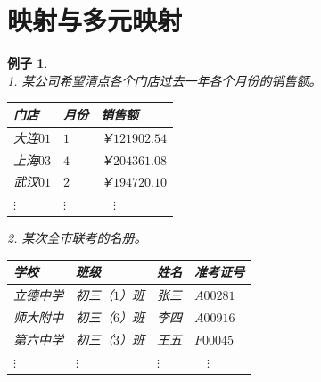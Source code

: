 \documentclass[12pt,UTF8]{ctexbook}
\newtheorem{ex}{例子}[section]
\begin{document}
\section{映射与多元映射}
\begin{ex}
    \mbox{}\\
    1. 某公司希望清点各个门店过去一年各个月份的销售额。
    \begin{center}
        \begin{tabular}{| p{4em}<{\centering} | p{2em}<{\centering} | p{6em}<{\centering} |}
            \hline
            门店 & 月份 & 销售额 \\ [0.5ex] 
            \hline
            大连$01$ & $1$ & ￥$121902.54$ \\  
            \hline
            上海$03$ & $4$ & ￥$204361.08$ \\  
            \hline
            武汉$01$ & $2$ & ￥$194720.10$ \\  
            \hline
            $\vdots$ & $\vdots$ & $\quad\vdots$ \\   
            \hline
        \end{tabular}
    \end{center}
    2. 某次全市联考的名册。
    \begin{center}
        \begin{tabular}{| p{4em}<{\centering} | p{6em}<{\centering} | p{3em}<{\centering} | p{4em}<{\centering} |}
            \hline
            学校 & 班级 & 姓名 & 准考证号 \\ [0.5ex] 
            \hline
            立德中学 & 初三（$1$）班 & 张三 & $A00281$ \\  
            \hline
            师大附中 & 初三（$6$）班 & 李四 & $A00916$ \\  
            \hline
            第六中学 & 初三（$3$）班 & 王五 & $F00045$ \\  
            \hline
            $\vdots$ & $\vdots$& $\vdots$ & $\quad\vdots$ \\   
            \hline
        \end{tabular}
    \end{center}
\end{ex}
\end{document}

